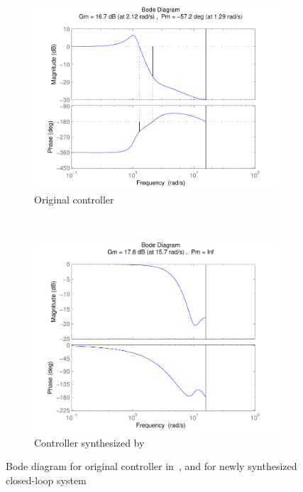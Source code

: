 \documentclass[final]{sig-alternate-05-2015}
\newcommand{\blue}[1]{{\color{blue}#1}}
\begin{document}
%
\begin{figure}[htb]
    \centering
    \begin{subfigure}[b]{0.4\textwidth}
        \includegraphics[width=\textwidth]{figures/runningexample_bd0.pdf}
        \caption{Original controller~\cite{DBLP:conf/hybrid/WangGRJF16}}
        \label{fig:original}
    \end{subfigure}
    ~
    \begin{subfigure}[b]{0.4\textwidth}
        \includegraphics[width=\textwidth]{figures/runningexample_bd2.pdf}
        \caption{Controller synthesized by \tool}
        \label{fig:cegiscontroller}
    \end{subfigure}
    \caption{Bode diagram for original controller in~\cite{DBLP:conf/hybrid/WangGRJF16}, 
    and for newly synthesized closed-loop system}\label{fig:bode}
\end{figure}
\end{document}

